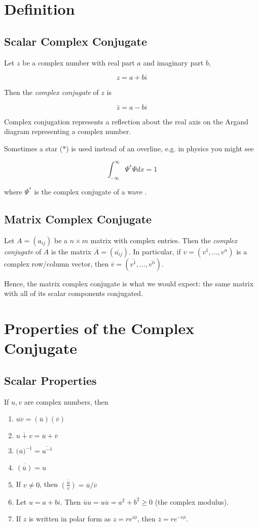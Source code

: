 \documentclass[12pt]{article}
\newcommand{\ccj}[1]{\overline{#1}}
\begin{document}
\section{Definition}
\subsection{Scalar Complex Conjugate}

Let $z$ be a complex number with real part $a$ and imaginary part $b$,

$$ z = a+bi $$

Then the \emph{complex conjugate} of $z$ is 

$$ \bar{z} = a - bi $$

Complex conjugation represents a reflection about the real axis on the Argand diagram representing a complex number.

Sometimes a star ($*$) is used instead of an overline, e.g. in physics you might see

$$ \int_{-\infty}^{\infty}\Psi^{*}\Psi dx=1 $$

where $\Psi^*$ is the complex conjugate of a wave .

\subsection{Matrix Complex Conjugate}

Let $A=(a_{ij})$ be a $n\times m$ matrix with complex
entries.  Then the \emph{complex conjugate} of $A$ is the matrix
$\ccj{A}=(\ccj{a_{ij}})$. In particular, if
$v=(v^1, \ldots, v^n)$ is a complex row/column vector, then
$\ccj{v}=(\ccj{v^1}, \ldots, \ccj{v^n})$.

Hence, the matrix complex conjugate is what we would expect: the same matrix with all of its scalar components conjugated.

\section{Properties of the Complex Conjugate}

\subsection{Scalar Properties}

If $u,v$ are complex numbers, then

\begin{enumerate}
 \item $\ccj{uv}= (\ccj{u})(\ccj{v})$
 \item $\ccj{u+v}= \ccj{u}+\ccj{v}$
 \item $\big(\ccj{u}\big)^{-1} = \ccj{u^{-1}}$
 \item $\ccj{(\ccj{u})} = u$
 \item If $v\neq 0$, then $\ccj{(\frac{u}{v})} = {\ccj{u}}/{\ccj{v}}$
 \item Let $u = a + bi$.  Then $\ccj{u} u = u \ccj{u} = a^2+b^2 \ge 0$ (the complex modulus).
 \item If $z$ is written in polar form as $z=r e^{i\phi}$, then
$\ccj{z}=re^{-i\phi}$.
\end{enumerate}
\end{document}
